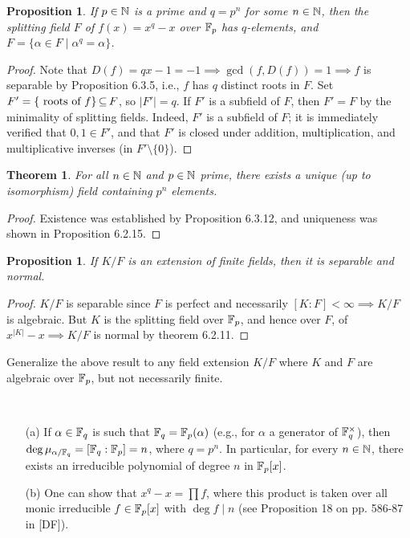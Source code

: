 \documentclass[11pt]{book}
\newcounter{counter}
\newtheorem{theorem}[counter]{Theorem}   \newtheorem*{theorem*}{Theorem}   \newtheorem{lemma}[counter]{Lemma}   \newtheorem{corollary}[counter]{Corollary}
\newtheorem{proposition}[counter]{Proposition}   \newtheorem{problem}[counter]{Problem}   \newtheorem*{proposition*}{Proposition}   \newtheorem*{lemma*}{Lemma}
\theoremstyle{definition}   \newtheorem{defn}[counter]{Definition} %
\newcommand{\bs}{\setminus}   \newcommand{\A}{\mathcal{A}}   \newcommand{\sy}{\textnormal{Syl}}   \newcommand{\size}[1]{\left| #1 \right|}
\newcommand{\vs}{\vspace{8pt}}   \newcommand{\hs}{\hspace{8pt}}
\numberwithin{counter}{chapter}
\begin{document}
\vs

\begin{proposition}
If $p \in \operatorname{\mathbb{N}}$ is a prime and $q = p^n$ for some $n \in \operatorname{\mathbb{N}}$, then the splitting field $F$ of $f(x) = x^q - x$ over $\mathbb{F}_p$ has $q$-elements, and $F = \{\alpha \in F \mid \alpha^q = \alpha\}$. 
\end{proposition}

\begin{proof}
Note that $D(f) = qx - 1 = -1 \implies \gcd(f,D(f)) = 1 \implies f$ is separable by Proposition 6.3.5, i.e., $f$ has $q$ distinct roots in $F$. Set $F' = \{ \textnormal{ roots of } f\} \operatorname{\subseteq} F$, so $|F'| = q$. If $F'$ is a subfield of $F$, then $F' = F$ by the minimality of splitting fields. Indeed, $F'$ is a subfield of $F$; it is immediately verified that $0,1 \in F'$, and that $F'$ is closed under addition, multiplication, and multiplicative inverses (in $F' \bs \{0\}$). 
\end{proof}

\vs

\begin{theorem}
For all $n \in \operatorname{\mathbb{N}}$ and $p \in \operatorname{\mathbb{N}}$ prime, there exists a unique (up to isomorphism) field containing $p^n$ elements.
\end{theorem}

\begin{proof}
Existence was established by Proposition 6.3.12, and uniqueness was shown in Proposition 6.2.15. 
\end{proof}

\vs

\begin{proposition}
If $K/F$ is an extension of finite fields, then it is separable and normal. 
\end{proposition}

\begin{proof}
$K/F$ is separable since $F$ is perfect and necessarily $[K : F ] < \infty \implies K/F$ is algebraic. But $K$ is the splitting field over $\mathbb{F}_p$, and hence over $F$, of $x^{|K|}-x \implies K/F$ is normal by theorem 6.2.11. 
\end{proof}

\vs

\noindent {} Generalize the above result to any field extension $K/F$ where $K$ and $F$ are algebraic over $\mathbb{F}_p$, but not necessarily finite. 

\vs

\begin{remark}\ 
\begin{enumerate}
\item[(a)] If $\alpha \in \mathbb{F}_q$ is such that $\mathbb{F}_q = \mathbb{F}_p(\alpha)$ (e.g., for $\alpha$ a generator of $\mathbb{F}_q^{\times}$), then $\deg \mu_{\alpha/\mathbb{F}_q} = [\mathbb{F}_q : \mathbb{F}_p] = n$, where $q = p^n$. In particular, for every $n \in \operatorname{\mathbb{N}}$, there exists an irreducible polynomial of degree $n$ in $\mathbb{F}_p[x]$. 
\item[(b)] One can show that $x^q-x = \prod f$, where this product is taken over all monic irreducible $f \in \mathbb{F}_p[x]$ with $\deg f \mid n$ (see Proposition 18 on pp. 586-87 in [DF]). 
\end{enumerate}
\end{remark}
\end{document}
